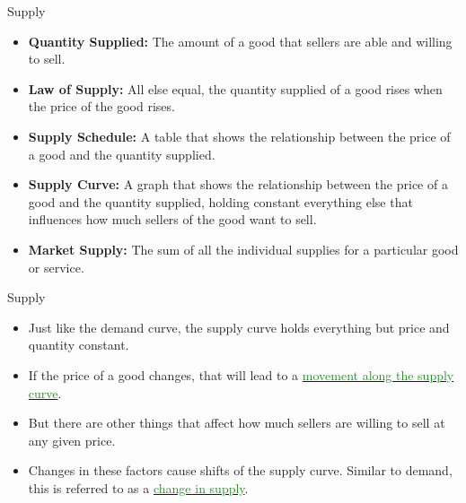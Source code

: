 \documentclass[xcolor={dvipsnames},pdf, hyperref={colorlinks=true, citecolor=ForestGreen, linkcolor=BlueViolet, urlcolor=Magenta}]{beamer}
\theoremstyle{definition}
\newcommand{\defn}[1]{\textbf{#1}}
\newcommand{\dd}[1]{{\underline{\textcolor{ForestGreen}{#1}}}}
\begin{document}
\begin{frame}{Supply}
	
\begin{itemize}
	\item 	\defn{Quantity Supplied:} The amount of a good that sellers are able and willing to sell.
	
	\item \defn{Law of Supply:} All else equal, the quantity supplied of a good rises when the price of the good rises.
	
	\item \defn{Supply Schedule:} A table that shows the relationship between the price of a good and the quantity supplied.
	
	\item \defn{Supply Curve:} A graph that shows the relationship between the price of a good and the quantity supplied, holding constant everything else that influences how much sellers of the good want to sell.
	
	\item \defn{Market Supply:} The sum of all the individual supplies for a particular good or service.
\end{itemize}
		
\end{frame}

\begin{frame}{Supply}
	
\begin{itemize}
	\item Just like the demand curve, the supply curve holds everything but price and quantity constant. 
	\item If the price of a good changes, that will lead to a \dd{movement along the supply curve}.
	\item But there are other things that affect how much sellers are willing to sell at any given price. 
	\item Changes in these factors cause shifts of the supply curve. Similar to demand, this is referred to as a \dd{change in supply}. 
\end{itemize}
	
\end{frame}
\end{document}
